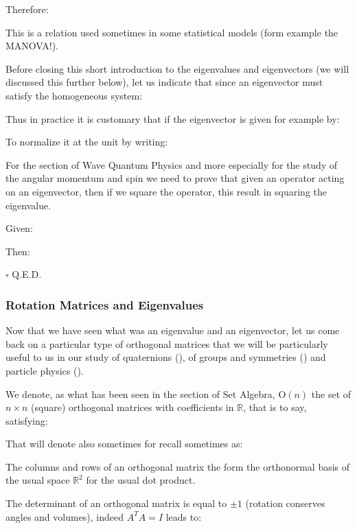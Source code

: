 	Therefore:
	
	This is a relation used sometimes in some statistical models (form example the MANOVA!). 
	
	Before closing this short introduction to the eigenvalues and eigenvectors (we will discussed this further below), let us indicate that since an eigenvector must satisfy the homogeneous system:
	
	
	Thus in practice it is customary that if the eigenvector is given for example by:
	
	To normalize it at the unit by writing:
	
	
	For the section of Wave Quantum Physics and more especially for the study of the angular momentum and spin we need to prove that given an operator acting on an eigenvector, then if we square the operator, this result in squaring the eigenvalue.
	\begin{dem}
	Given:
	
	Then:
	
	\begin{flushright}
		$\square$  Q.E.D.
	\end{flushright}
	\end{dem}
	
	\subsubsection{Rotation Matrices and Eigenvalues}\label{rotation matrix in linear algebra}
	Now that we have seen what was an eigenvalue and an eigenvector, let us come back on a particular type of orthogonal matrices that we will be particularly useful to us in our study of quaternions (), of groups and symmetries () and particle physics ().
	
	We denote, as what has been seen in the section of Set Algebra, $\text{O}(n)$ the set of $n\times n$ (square) orthogonal matrices with coefficients in $\mathbb{R}$, that is to say, satisfying:
	
	That will denote also sometimes for recall sometimes as:
	
	The columns and rows of an orthogonal matrix the form the orthonormal basis of the usual space $\mathbb{R}^2$ for the usual dot product.
	
	The determinant of an orthogonal matrix is equal to $\pm 1$ (rotation conserves angles and volumes), indeed $A^T A=I$  leads to:
	
